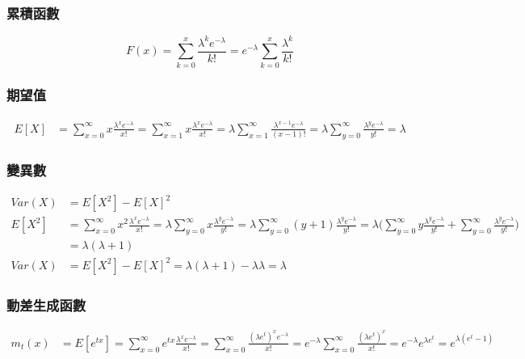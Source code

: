 \documentclass{article}
\begin{document}
\subsubsection{累積函數}
\[ F(x)=\sum_{k=0}^x{\frac{\lambda^k e^{-\lambda}}{k!}}
       =e^{-\lambda}\sum_{k=0}^x{\frac{\lambda^k}{k!}} \]

\subsubsection{期望值}
\begin{align*}
E[X]
& = \sum_{x=0}^\infty{x\frac{\lambda^x e^{-\lambda}}{x!}}
  = \sum_{x=1}^\infty{x\frac{\lambda^x e^{-\lambda}}{x!}}
  = \lambda\sum_{x=1}^\infty{\frac{\lambda^{x-1} e^{-\lambda}}{(x-1)!}}
  = \lambda\sum_{y=0}^\infty{\frac{\lambda^y e^{-\lambda}}{y!}}
  = \lambda
\end{align*}

\subsubsection{變異數}
\begin{align*}
Var(X)
& = E[X^2]-E[X]^2 \\
E[X^2] & = \sum_{x=0}^\infty{x^2\frac{\lambda^x e^{-\lambda}}{x!}}
  = \lambda\sum_{y=0}^\infty{x\frac{\lambda^y e^{-\lambda}}{y!}}
  = \lambda\sum_{y=0}^\infty{(y+1)\frac{\lambda^y e^{-\lambda}}{y!}}
  = \lambda\bigg(
      \sum_{y=0}^\infty{y\frac{\lambda^y e^{-\lambda}}{y!}}+
      \sum_{y=0}^\infty{\frac{\lambda^y e^{-\lambda}}{y!}}\bigg) \\
& = \lambda(\lambda+1) \\
Var(X) & = E[X^2]-E[X]^2
  = \lambda(\lambda+1)-\lambda\lambda
  = \lambda
\end{align*}

\subsubsection{動差生成函數}
\begin{align*}
m_t(x)
& = E[e^{tx}]
  = \sum_{x=0}^\infty{e^{tx}\frac{\lambda^x e^{-\lambda}}{x!}}
  = \sum_{x=0}^\infty{\frac{(\lambda e^t)^x e^{-\lambda}}{x!}}
  = e^{-\lambda}\sum_{x=0}^\infty{\frac{(\lambda e^t)^x}{x!}}
  = e^{-\lambda}e^{\lambda e^t}
  = e^{\lambda(e^t-1)}
\end{align*}
\end{document}
